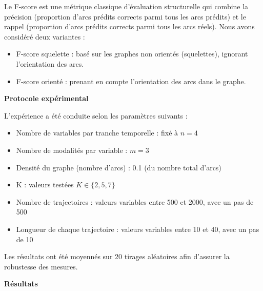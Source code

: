 \documentclass{article}
\begin{document}
Le F-score est une métrique classique d'évaluation structurelle qui combine la précision
(proportion d'arcs prédits corrects parmi tous les arcs prédits) et le rappel (proportion d'arcs prédits corrects
parmi tous les arcs réels). Nous avons considéré deux variantes :

\begin{itemize}
    \item F-score squelette : basé sur les graphes non orientés (squelettes), ignorant l'orientation des arcs.
    \item F-score orienté : prenant en compte l'orientation des arcs dans le graphe.
\end{itemize}

\textbf{Protocole expérimental}

L'expérience a été conduite selon les paramètres suivants :

\begin{itemize}
    \item Nombre de variables par tranche temporelle : fixé à $n=4$
    \item Nombre de modalités par variable : $m=3$
    \item Densité du graphe (nombre d’arcs) : 0.1 (du nombre total d’arcs)
    \item K : valeurs testées $K \in \{2, 5, 7\}$
    \item Nombre de trajectoires : valeurs variables entre 500 et 2000, avec un pas de 500
    \item Longueur de chaque trajectoire : valeurs variables entre 10 et 40, avec un pas de 10
\end{itemize}

Les résultats ont été moyennés sur 20 tirages aléatoires afin d'assurer la robustesse des mesures.

\textbf{Résultats}
\end{document}
